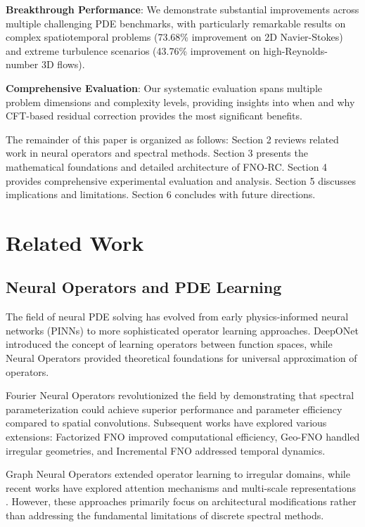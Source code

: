 \documentclass[11pt]{article}
\begin{document}
\textbf{Breakthrough Performance}: We demonstrate substantial improvements across multiple challenging PDE benchmarks, with particularly remarkable results on complex spatiotemporal problems (73.68\% improvement on 2D Navier-Stokes) and extreme turbulence scenarios (43.76\% improvement on high-Reynolds-number 3D flows).

\textbf{Comprehensive Evaluation}: Our systematic evaluation spans multiple problem dimensions and complexity levels, providing insights into when and why CFT-based residual correction provides the most significant benefits.

The remainder of this paper is organized as follows: Section 2 reviews related work in neural operators and spectral methods. Section 3 presents the mathematical foundations and detailed architecture of FNO-RC. Section 4 provides comprehensive experimental evaluation and analysis. Section 5 discusses implications and limitations. Section 6 concludes with future directions.

\section{Related Work}

\subsection{Neural Operators and PDE Learning}

The field of neural PDE solving has evolved from early physics-informed neural networks (PINNs) \citep{raissi2019physics} to more sophisticated operator learning approaches. DeepONet \citep{lu2021learning} introduced the concept of learning operators between function spaces, while Neural Operators \citep{kovachki2021neural} provided theoretical foundations for universal approximation of operators.

Fourier Neural Operators \citep{li2020fourier} revolutionized the field by demonstrating that spectral parameterization could achieve superior performance and parameter efficiency compared to spatial convolutions. Subsequent works have explored various extensions: Factorized FNO \citep{tran2021factorized} improved computational efficiency, Geo-FNO \citep{li2022fourier} handled irregular geometries, and Incremental FNO \citep{tran2021factorized} addressed temporal dynamics.

Graph Neural Operators \citep{li2020neural} extended operator learning to irregular domains, while recent works have explored attention mechanisms \citep{cao2021choose} and multi-scale representations \citep{pathak2022fourcastnet}. However, these approaches primarily focus on architectural modifications rather than addressing the fundamental limitations of discrete spectral methods.
\end{document}
